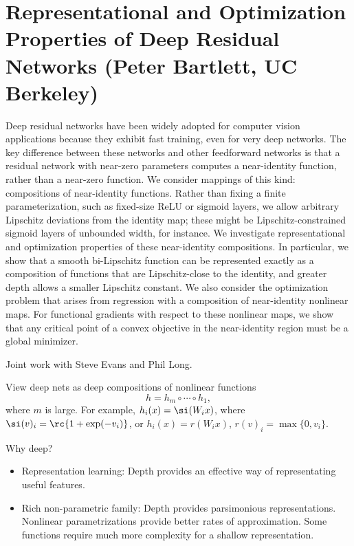 \section{Representational and Optimization Properties of Deep Residual Networks (Peter Bartlett, UC Berkeley)}

Deep residual networks have been widely adopted for computer vision applications because they exhibit fast training, even for very deep networks.  The key difference between these networks and other feedforward networks is that a residual network with near-zero parameters computes a near-identity function, rather than a near-zero function. We consider mappings of this kind: compositions of near-identity functions. Rather than fixing a finite parameterization, such as fixed-size ReLU or sigmoid layers, we allow arbitrary Lipschitz deviations from the identity map; these might be Lipschitz-constrained sigmoid layers of unbounded width, for instance.  We investigate representational and optimization properties of these near-identity compositions. In particular, we show that a smooth bi-Lipschitz function can be represented exactly as a composition of functions that are Lipschitz-close to the identity, and greater depth allows a smaller Lipschitz constant.  We also consider the optimization problem that arises from regression with a composition of near-identity nonlinear maps. For functional gradients with respect to these nonlinear maps, we show that any critical point of a convex objective in the near-identity region must be a global minimizer.
 
Joint work with Steve Evans and Phil Long.

View deep nets as deep compositions of nonlinear functions
$$
h=h_m\circ \cdots \circ h_1,
$$
where $m$ is large.
For example, $h_i(x) = \si(W_ix)$, where $\si(v)_i = \rc{1+\exp(-v_i)}$, or $h_i(x)=r(W_ix)$, $r(v)_i = \max\{0,v_i\}$. 


Why deep?
\begin{itemize}
\item
Representation learning: Depth provides an effective way of representating useful features.
\item
Rich non-parametric family: Depth provides parsimonious representations. Nonlinear parametrizations provide better rates of approximation. Some functions require much more complexity for a shallow representation.
\end{itemize}

